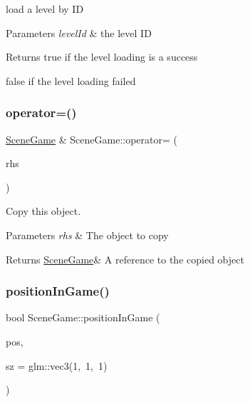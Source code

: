 load a level by ID 


\begin{DoxyParams}{Parameters}
{\em level\+Id} & the level ID \\
\hline
\end{DoxyParams}
\begin{DoxyReturn}{Returns}
true if the level loading is a success 

false if the level loading failed 
\end{DoxyReturn}
\mbox{\label{class_scene_game_a43a31ea04e25cc4ca0f2bf7e0b082c66}} 
\subsubsection{\texorpdfstring{operator=()}{operator=()}}
{\footnotesize\ttfamily \hyperlink{class_scene_game}{Scene\+Game} \& Scene\+Game\+::operator= (\begin{DoxyParamCaption}\item[{\hyperlink{class_scene_game}{Scene\+Game} const \&}]{rhs }\end{DoxyParamCaption})}



Copy this object. 


\begin{DoxyParams}{Parameters}
{\em rhs} & The object to copy \\
\hline
\end{DoxyParams}
\begin{DoxyReturn}{Returns}
\hyperlink{class_scene_game}{Scene\+Game}\& A reference to the copied object 
\end{DoxyReturn}
\mbox{\label{class_scene_game_a0d5f3a9ca2d04f3c4fa26813614b555c}} 
\subsubsection{\texorpdfstring{position\+In\+Game()}{positionInGame()}}
{\footnotesize\ttfamily bool Scene\+Game\+::position\+In\+Game (\begin{DoxyParamCaption}\item[{glm\+::vec3}]{pos,  }\item[{glm\+::vec3}]{sz = {\ttfamily glm\+:\+:vec3(1,~1,~1)} }\end{DoxyParamCaption})}



